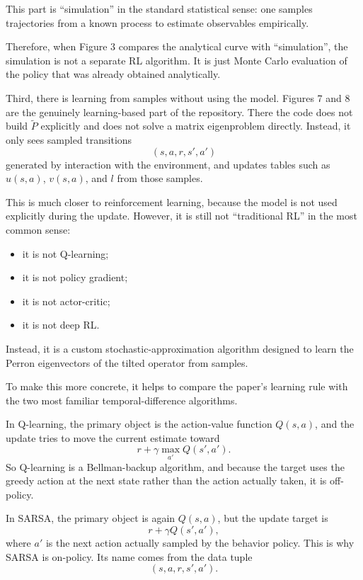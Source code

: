 \documentclass[11pt]{article}
\begin{document}
This part is ``simulation'' in the standard statistical sense: one samples trajectories from a
known process to estimate observables empirically.

Therefore, when Figure 3 compares the analytical curve with ``simulation'', the simulation is
not a separate RL algorithm. It is just Monte Carlo evaluation of the policy that was already
obtained analytically.

Third, there is learning from samples without using the model.
Figures 7 and 8 are the genuinely learning-based part of the repository. There the code does
not build \(\widetilde{P}\) explicitly and does not solve a matrix eigenproblem directly.
Instead, it only sees sampled transitions
\begin{equation}
    (s,a,r,s',a')
\end{equation}
generated by interaction with the environment, and updates tables such as \(u(s,a)\),
\(v(s,a)\), and \(l\) from those samples.

This is much closer to reinforcement learning, because the model is not used explicitly during
the update. However, it is still not ``traditional RL'' in the most common sense:
\begin{itemize}
    \item it is not Q-learning;
    \item it is not policy gradient;
    \item it is not actor-critic;
    \item it is not deep RL.
\end{itemize}

Instead, it is a custom stochastic-approximation algorithm designed to learn the Perron
eigenvectors of the tilted operator from samples.

To make this more concrete, it helps to compare the paper's learning rule with the two most
familiar temporal-difference algorithms.

In Q-learning, the primary object is the action-value function \(Q(s,a)\), and the update tries
to move the current estimate toward
\begin{equation}
    r + \gamma \max_{a'} Q(s',a').
\end{equation}
So Q-learning is a Bellman-backup algorithm, and because the target uses the greedy action at
the next state rather than the action actually taken, it is off-policy.

In SARSA, the primary object is again \(Q(s,a)\), but the update target is
\begin{equation}
    r + \gamma Q(s',a'),
\end{equation}
where \(a'\) is the next action actually sampled by the behavior policy. This is why SARSA is
on-policy. Its name comes from the data tuple
\begin{equation}
    (s,a,r,s',a').
\end{equation}
\end{document}
